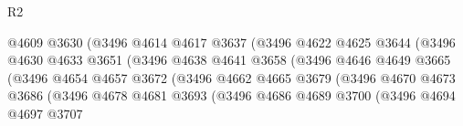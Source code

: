 \begin{lexlean}{R2}
\begin{coremodule}
                                        @4609
                                        @3630
                                        (@3496
                                          @4614
                                          @4617
                                          @3637
                                          (@3496
                                            @4622
                                            @4625
                                            @3644
                                            (@3496
                                              @4630
                                              @4633
                                              @3651
                                              (@3496
                                                @4638
                                                @4641
                                                @3658
                                                (@3496
                                                  @4646
                                                  @4649
                                                  @3665
                                                  (@3496
                                                    @4654
                                                    @4657
                                                    @3672
                                                    (@3496
                                                      @4662
                                                      @4665
                                                      @3679
                                                      (@3496
                                                        @4670
                                                        @4673
                                                        @3686
                                                        (@3496
                                                          @4678
                                                          @4681
                                                          @3693
                                                          (@3496
                                                            @4686
                                                            @4689
                                                            @3700
                                                            (@3496
                                                              @4694
                                                              @4697
                                                              @3707

\end{coremodule}
\end{lexlean}
